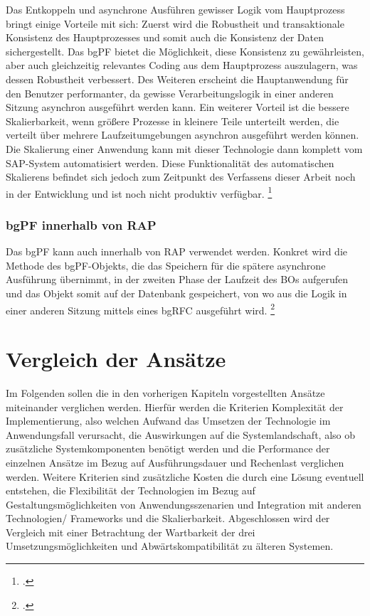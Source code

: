 Das Entkoppeln und asynchrone Ausführen gewisser Logik vom Hauptprozess bringt einige Vorteile mit sich: Zuerst wird die Robustheit und transaktionale Konsistenz des Hauptprozesses und somit auch die Konsistenz der Daten sichergestellt. Das bgPF bietet die Möglichkeit, diese Konsistenz zu gewährleisten, aber auch gleichzeitig relevantes Coding aus dem Hauptprozess auszulagern, was dessen Robustheit verbessert. Des Weiteren erscheint die Hauptanwendung für den Benutzer performanter, da gewisse Verarbeitungslogik in einer anderen Sitzung asynchron ausgeführt werden kann. Ein weiterer Vorteil ist die bessere Skalierbarkeit, wenn grö{\ss}ere Prozesse in kleinere Teile unterteilt werden, die verteilt über mehrere Laufzeitumgebungen asynchron ausgeführt werden können. Die Skalierung einer Anwendung kann mit dieser Technologie dann komplett vom SAP-System automatisiert werden. Diese Funktionalität des automatischen Skalierens befindet sich jedoch zum Zeitpunkt des Verfassens dieser Arbeit noch in der Entwicklung und ist noch nicht produktiv verfügbar. \footcite[Vgl.][]{sap_bgpf_2023}

\subsubsection{bgPF innerhalb von RAP}

Das bgPF kann auch innerhalb von RAP verwendet werden. 
Konkret wird die Methode des bgPF-Objekts, die das Speichern für die spätere asynchrone Ausführung übernimmt, in der zweiten Phase der Laufzeit des BOs aufgerufen und das Objekt somit auf der Datenbank gespeichert, von wo aus die Logik in einer anderen Sitzung mittels eines bgRFC ausgeführt wird. \footcite[Vgl.][]{sap_bgpf_2023}

\section{Vergleich der Ansätze}

Im Folgenden sollen die in den vorherigen Kapiteln vorgestellten Ansätze miteinander verglichen werden. Hierfür werden die Kriterien Komplexität der Implementierung, also welchen Aufwand das Umsetzen der Technologie im Anwendungsfall verursacht, die Auswirkungen auf die Systemlandschaft, also ob zusätzliche Systemkomponenten benötigt werden und die Performance der einzelnen Ansätze im Bezug auf Ausführungsdauer und Rechenlast verglichen werden. Weitere Kriterien sind zusätzliche Kosten die durch eine Lösung eventuell entstehen, die Flexibilität der Technologien im Bezug auf Gestaltungsmöglichkeiten von Anwendungsszenarien und Integration mit anderen Technologien/ Frameworks und die Skalierbarkeit. Abgeschlossen wird der Vergleich mit einer Betrachtung der Wartbarkeit der drei Umsetzungsmöglichkeiten und Abwärtskompatibilität zu älteren Systemen.


